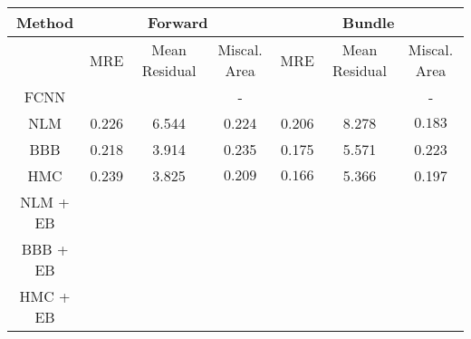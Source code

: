 \documentclass[convert={outext=.png}]{standalone}
\begin{document}

\begin{tabular}{c c c c c c c}
\hline
\hline
Method &  \multicolumn{3}{c}{Forward} & \multicolumn{3}{c}{Bundle} \\ \hline
 & MRE & Mean Residual & Miscal. Area & MRE & Mean Residual & Miscal. Area\\
 FCNN &  &  & - &  &  & - \\
 \hline
 NLM & 0.226 & 6.544 & 0.224 & 0.206 & 8.278 & $\mathbf{0.183}$ \\
 BBB & 0.218 & 3.914 & 0.235 & 0.175 & 5.571 & 0.223 \\
 HMC & 0.239 & 3.825 & $\mathbf{0.209}$ & $\mathbf{0.166}$ & 5.366 & 0.197 \\
 \hline
 NLM + EB &  &  &  &  &  &  \\
 BBB + EB &  &  &  &  &  &  \\
 HMC + EB &  &  &  &  &  &  \\
\hline
\hline
\end{tabular}
\end{document}
